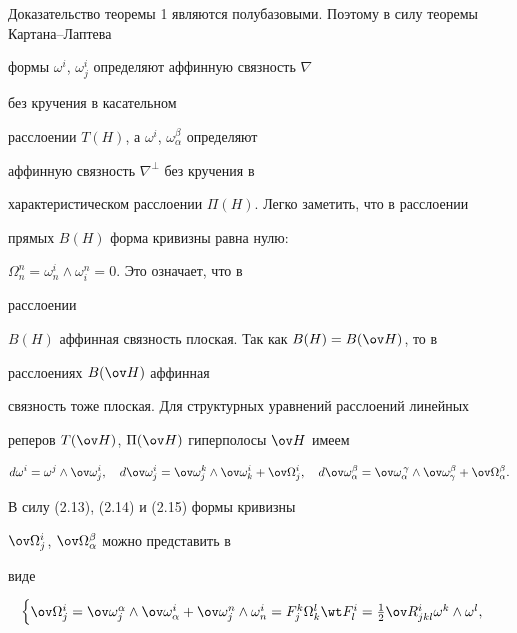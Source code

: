 \begin{pf*}{Доказательство теоремы 1}
являются полубазовыми. Поэтому в силу теоремы Картана--Лаптева \cite{9} 


формы $\omega^i$, $\omega^i_j$ определяют аффинную связность $\nabla$ 


без кручения в касательном 


расслоении $T(H)$, а $\omega^i$, $\omega^\beta_\alpha$ определяют 


аффинную связность $\nabla^\bot$ без кручения в 


характеристическом расслоении $\Pi(H)$. Легко заметить, что в расслоении 


прямых $B(H)$ форма кривизны равна нулю: 


$\Omega^n_n=\omega^i_n\wedge\omega^n_i=0$. Это означает, что в 


расслоении 


$B(H)$ аффинная связность плоская. Так как $B(H)=B(\ov H)$, то в 


расслоениях $B(\ov H)$ аффинная 


связность тоже плоская. Для структурных уравнений расслоений линейных 


реперов $T(\ov H)$, $\Pi(\ov H)$ гиперполосы $\ov H$ имеем 


\begin{equation} 


d\omega^i=\omega^j\wedge\ov\omega^i_j,\quad 


d\ov\omega^i_j=\ov\omega^k_j\wedge\ov\omega^i_k+\ov\Omega^i_j, 


\quad d\ov\omega^\beta_\alpha=\ov\omega^{\,\gamma}_\alpha\wedge 


\ov\omega^\beta_\gamma+\ov\Omega^\beta_\alpha. 


\end{equation} 


В силу (2.13), (2.14) и (2.15) формы кривизны 


$\ov\Omega^i_j$, $\ov\Omega^\beta_\alpha$ можно представить в 


виде 


\begin{equation} 


\begin{cases} 


\ov\Omega^i_j=\ov\omega^\alpha_j\wedge\ov\omega^i_\alpha+ 


\ov\omega^n_j\wedge\omega^i_n=F^k_j\Omega^l_k\wt F^i_l= 


\frac{1}{2}\ov R^i_{jkl}\omega^k\wedge\omega^l, \\ 



\end{cases}
\end{equation}
\end{pf*}
